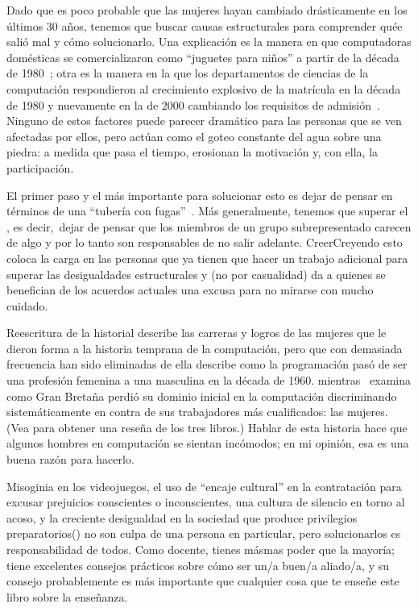 
Dado que es poco probable que las mujeres hayan cambiado drásticamente en los últimos 30 años,
tenemos que buscar causas estructurales para comprender quée salió mal y cómo solucionarlo.
Una explicación es la manera en que computadoras domésticas se comercializaron como ``juguetes para niños'' a partir de la década de 1980~\cite{Marg2003};
otra es la manera en la que los departamentos de ciencias de la computación respondieron al crecimiento explosivo de la matrícula
en la década de 1980 y nuevamente en la de 2000
cambiando los requisitos de admisión~\cite{Robe2017}.
Ninguno de estos factores puede parecer dramático para las personas que se ven afectadas por ellos,
pero actúan como el goteo constante del agua sobre una piedra:
a medida que pasa el tiempo, erosionan la motivación y, con ella, la participación.

El primer paso y el más importante para solucionar esto es
dejar de pensar en términos de una ``tubería con fugas''~\cite{Mill2015}.
Más generalmente,
tenemos que superar el ,
es decir,\ dejar de pensar que los miembros de un grupo subrepresentado carecen de algo
y por lo tanto son responsables de no salir adelante.
CreerCreyendo esto coloca la carga en las personas que ya tienen que hacer un trabajo adicional para superar las desigualdades estructurales
y (no por casualidad) da a quienes se benefician de los acuerdos actuales
una excusa para no mirarse con mucho cuidado.

\begin{aside}{Reescritura de la historial}
  \cite{Abba2012} describe las carreras y logros de
    las mujeres que le dieron forma a la historia temprana de la computación,
    pero que con demasiada frecuencia han sido eliminadas de ella
    \cite{Ensm2003,Ensm2012} describe como la programación pasó de ser una profesión femenina a una masculina en la década de 1960.
    mientras~\cite{Hick2018} examina como Gran Bretaña perdió su dominio inicial en la computación
    discriminando sistemáticamente en contra de sus trabajadores más cualificados:
    las mujeres.
    (Vea \cite{Milt2018} para obtener una reseña de los tres libros.)
    Hablar de esta historia hace que algunos hombres en computación se sientan incómodos;
    en mi opinión,
    esa es una buena razón para hacerlo.
\end{aside}

Misoginia en los videojuegos,
el uso de ``encaje cultural'' en la contratación para excusar prejuicios conscientes o inconscientes,
una cultura de silencio en torno al acoso,
y la creciente desigualdad en la sociedad que produce privilegios preparatorios()
no son culpa de una persona en particular,
pero solucionarlos es responsabilidad de todos.
Como docente,
tienes másmas poder que la mayoría;
tiene excelentes consejos prácticos sobre cómo ser un/a buen/a aliado/a,
y su consejo probablemente es más importante que cualquier cosa que te enseñe este libro sobre la enseñanza.

